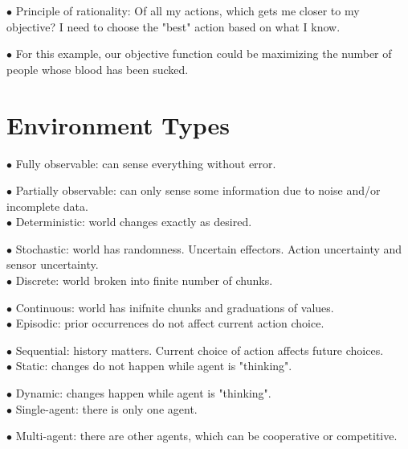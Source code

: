 \documentclass[english,openany]{book}
\begin{document}
    $\bullet$ Principle of rationality: Of all my actions, which gets me closer to my objective? I need to choose the "best" action based on what I know.
    
    $\bullet$ For this example, our objective function could be maximizing the number of people whose blood has been sucked.
    
    
    \section{Environment Types}
    
    $\bullet$ Fully observable: can sense everything without error.
    
    $\bullet$ Partially observable: can only sense some information due to noise and/or incomplete data.\\
    
    $\bullet$ Deterministic: world changes exactly as desired.
    
    $\bullet$ Stochastic: world has randomness. Uncertain effectors. Action uncertainty and sensor uncertainty.\\
    
    $\bullet$ Discrete: world broken into finite number of chunks.
    
    $\bullet$ Continuous: world has inifnite chunks and graduations of values.\\
    
    $\bullet$ Episodic: prior occurrences do not affect current action choice.
    
    $\bullet$ Sequential: history matters. Current choice of action affects future choices.\\
    
    $\bullet$ Static: changes do not happen while agent is "thinking".
    
    $\bullet$ Dynamic: changes happen while agent is "thinking".\\
    
    $\bullet$ Single-agent: there is only one agent.
    
    $\bullet$ Multi-agent: there are other agents, which can be cooperative or competitive.\\
    
\end{document}
